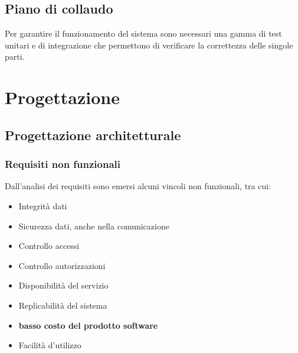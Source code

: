 \documentclass[a4paper]{article}
\begin{document}
\newpage

\subsection{Piano di collaudo}

Per garantire il funzionamento del sistema sono necessari una gamma di test unitari e
di integrazione che permettono di verificare la correttezza delle singole parti.




\newpage

\section{Progettazione}

\subsection{Progettazione architetturale}

\subsubsection{Requisiti non funzionali}

Dall’analisi dei requisiti sono emersi alcuni vincoli non funzionali, tra cui:

\begin{itemize}
    \item Integrità dati
    \item Sicurezza dati, anche nella comunicazione
    \item Controllo accessi
    \item Controllo autorizzazioni
    \item Disponibilità del servizio
    \item Replicabilità del sistema
    \item \textbf{basso costo del prodotto software}
    \item Facilità d’utilizzo
\end{itemize}
\end{document}
